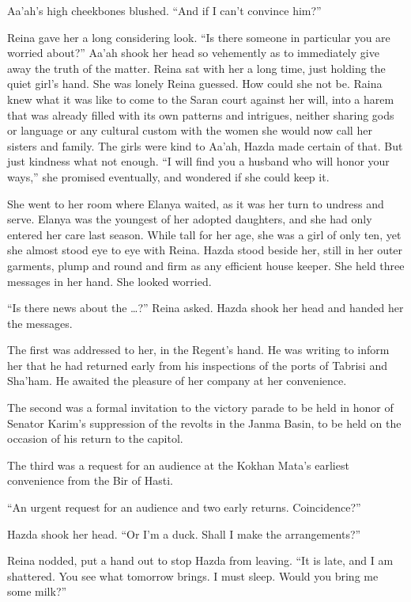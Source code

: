 \documentclass{article}
\begin{document}
	Aa’ah’s high cheekbones blushed. “And if I can’t convince him?” 
	
	Reina gave her a long considering look. “Is there someone in particular you are worried about?” Aa’ah shook her head so vehemently as to immediately give away the truth of the matter. Reina sat with her a long time, just holding the quiet girl’s hand. She was lonely Reina guessed. How could she not be. Raina knew what it was like to come to the Saran court against her will, into a harem that was already filled with its own patterns and intrigues, neither sharing gods or language or any cultural custom with the women she would now call her sisters and family. The girls were kind to Aa’ah, Hazda made certain of that. But just kindness what not enough. “I will find you a husband who will honor your ways,” she promised eventually, and wondered if she could keep it.
	
	She went to her room where Elanya waited, as it was her turn to undress and serve. Elanya was the youngest of her adopted daughters, and she had only entered her care last season. While tall for her age, she was a girl of only ten, yet she almost stood eye to eye with Reina. Hazda stood beside her, still in her outer garments, plump and round and firm as any efficient house keeper. She held three messages in her hand. She looked worried.
	
	“Is there news about the …?” Reina asked. Hazda shook her head and handed her the messages. 
	
	The first was addressed to her, in the Regent’s hand. He was writing to inform her that he had returned early from his inspections of the ports of Tabrisi and Sha’ham. He awaited the pleasure of her company at her convenience.
	
	The second was a formal invitation to the victory parade to be held in honor of Senator Karim’s suppression of the revolts in the Janma Basin, to be held on the occasion of his return to the capitol. 
	
	The third was a request for an audience at the Kokhan Mata’s earliest convenience from the Bir of Hasti.
	
	“An urgent request for an audience and two early returns. Coincidence?” 
	
	Hazda shook her head. “Or I’m a duck. Shall I make the arrangements?” 
	
	Reina nodded, put a hand out to stop Hazda from leaving. “It is late, and I am shattered. You see what tomorrow brings. I must sleep. Would you bring me some milk?”
	
\end{document}
